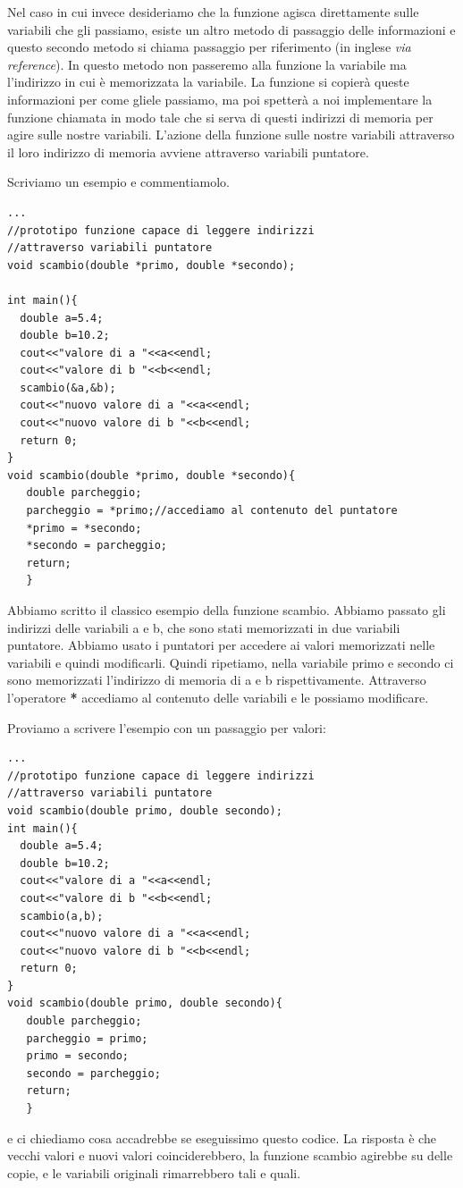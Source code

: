 \documentclass[11pt,fleqn]{book} %
\begin{document}
Nel caso in cui invece desideriamo che la funzione agisca direttamente sulle variabili che gli passiamo, esiste un altro metodo di passaggio delle informazioni e questo secondo metodo si chiama passaggio per riferimento (in inglese \textit{via reference}). In questo metodo non passeremo alla funzione la variabile ma l'indirizzo in cui è memorizzata la variabile. La funzione si copierà queste informazioni per come gliele passiamo, ma poi spetterà a noi implementare la funzione chiamata in modo tale che si serva di questi indirizzi di memoria per agire sulle nostre variabili. L'azione della funzione sulle nostre variabili attraverso il loro indirizzo di memoria avviene attraverso variabili puntatore.

Scriviamo un esempio e commentiamolo.

\begin{verbatim}
...
//prototipo funzione capace di leggere indirizzi
//attraverso variabili puntatore
void scambio(double *primo, double *secondo);

int main(){
  double a=5.4;
  double b=10.2;
  cout<<"valore di a "<<a<<endl;
  cout<<"valore di b "<<b<<endl;
  scambio(&a,&b);
  cout<<"nuovo valore di a "<<a<<endl;
  cout<<"nuovo valore di b "<<b<<endl;
  return 0;
}
void scambio(double *primo, double *secondo){
   double parcheggio;
   parcheggio = *primo;//accediamo al contenuto del puntatore
   *primo = *secondo;
   *secondo = parcheggio;
   return;
   }
\end{verbatim}

Abbiamo scritto il classico esempio della funzione scambio. Abbiamo passato gli indirizzi delle variabili a e b, che sono stati memorizzati in due variabili puntatore. Abbiamo usato i puntatori per accedere ai valori memorizzati nelle variabili e quindi modificarli.
Quindi ripetiamo, nella variabile primo e secondo ci sono memorizzati l'indirizzo di memoria di a e b rispettivamente. Attraverso l'operatore \textbf{*} accediamo al contenuto delle variabili e le possiamo modificare.

Proviamo a scrivere l'esempio con un passaggio per valori:
\begin{verbatim}
...
//prototipo funzione capace di leggere indirizzi
//attraverso variabili puntatore
void scambio(double primo, double secondo);
int main(){
  double a=5.4;
  double b=10.2;
  cout<<"valore di a "<<a<<endl;
  cout<<"valore di b "<<b<<endl;
  scambio(a,b);
  cout<<"nuovo valore di a "<<a<<endl;
  cout<<"nuovo valore di b "<<b<<endl;
  return 0;
}
void scambio(double primo, double secondo){
   double parcheggio;
   parcheggio = primo;
   primo = secondo;
   secondo = parcheggio;
   return;
   }
\end{verbatim}
e ci chiediamo cosa accadrebbe se eseguissimo questo codice.
La risposta è che vecchi valori e nuovi valori coinciderebbero, la funzione scambio agirebbe su delle copie, e le variabili originali rimarrebbero tali e quali.
\end{document}
